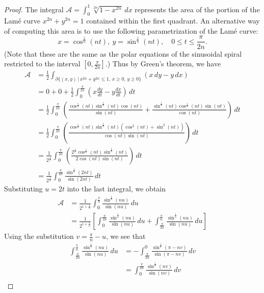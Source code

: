 \documentclass[10pt,a4paper]{amsart}
\newcommand{\calA}{\mathcal{A}}
\begin{document}
\begin{proof}
The integral $\calA=\int_0^1 \sqrt[2n]{1-x^{2n}} \, dx$ represents the area of the portion of
the Lam\'e curve $x^{2n}+y^{2n}=1$ contained within the first quadrant. An alternative way of
computing this area is to use the following parametrization of the Lam\'e curve:
\[x=\cos^{\frac{1}{n}}(nt),\ y=\sin^{\frac{1}{n}}(nt),\quad 0\le t\le\frac{\pi}{2n}.\]
(Note that these are the same as the polar equations of the sinusoidal spiral restricted to the interval $\left[0,\frac{\pi}{2n}\right]$.)
Thus by Green's theorem, we have
\begin{align*}
\calA &=\frac{1}{2}\int_{\partial\{(x,y)\,|\,x^{2n}+y^{2n}\le1,\,x\ge0,\,y\ge0\}}(x\,dy-y\,dx)\\
&=0+0+\frac{1}{2}\int_0^{\frac{\pi}{2n}}\left(x\frac{dy}{dt}-y\frac{dx}{dt}\right)\,dt\\
&=\frac{1}{2}\int_0^{\frac{\pi}{2n}}\left(\frac{\cos^{\frac{1}{n}}(nt)\sin^{\frac{1}{n}}(nt)\cos(nt)}{\sin(nt)}+
\frac{\sin^{\frac{1}{n}}(nt)\cos^{\frac{1}{n}}(nt)\sin(nt)}{\cos(nt)}\right)\,dt\\
&=\frac{1}{2}\int_0^{\frac{\pi}{2n}}\left(\frac{\cos^{\frac{1}{n}}(nt)\sin^{\frac{1}{n}}(nt)\left(\cos^2(nt)+\sin^2(nt)\right)}{\cos(nt)\sin(nt)}\right)\,dt\\
&=\frac{1}{2^{\frac{1}{n}}}\int_0^{\frac{\pi}{2n}}\left(\frac{2^{\frac{1}{n}}\cos^{\frac{1}{n}}(nt)\sin^{\frac{1}{n}}(nt)}{2\cos(nt)\sin(nt)}\right)\,dt\\
&=\frac{1}{2^{\frac{1}{n}}}\int_0^{\frac{\pi}{2n}}\frac{\sin^{\frac{1}{n}}(2nt)}{\sin(2nt)}\,dt
\end{align*}
Substituting $u=2t$ into the last integral, we obtain
\begin{align}
\calA&=\frac{1}{2^{1+\frac{1}{n}}}\int_0^{\frac{\pi}{n}}\frac{\sin^{\frac{1}{n}}(nu)}{\sin(nu)}\,du\nonumber\\
&=
\frac{1}{2^{1+\frac{1}{n}}}\left[\int_0^{\frac{\pi}{2n}}\frac{\sin^{\frac{1}{n}}(nu)}{\sin(nu)}\,du+\int_{\frac{\pi}{2n}}^{\frac{\pi}{n}}\frac{\sin^{\frac{1}{n}}(nu)}{\sin(nu)}\,du\right]\label{area_eqn2}
\end{align}
Using the substitution $v=\frac{\pi}{n}-u$, we see that
\begin{align*}
\int_{\frac{\pi}{2n}}^{\frac{\pi}{n}}\frac{\sin^{\frac{1}{n}}(nu)}{\sin(nu)}\,du &=-\int_{\frac{\pi}{2n}}^0\frac{\sin^{\frac{1}{n}}(\pi-nv)}{\sin(\pi-nv)}\,dv\\
&=\int_0^{\frac{\pi}{2n}}\frac{\sin^{\frac{1}{n}}(nv)}{\sin(nv)}\,dv\\

\end{align*}
\end{proof}
\end{document}
